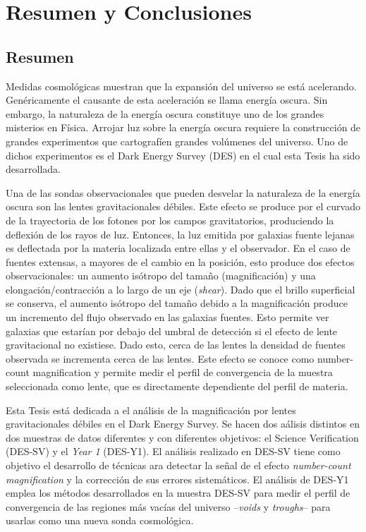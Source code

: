 \chapter*{Resumen y Conclusiones}
\section*{Resumen}
Medidas cosmol\'ogicas muestran que la expansi\'on del universo se est\'a acelerando. Gen\'ericamente el causante de esta aceleraci\'on se llama energ\'ia oscura. Sin embargo, la naturaleza de la energ\'ia oscura constituye uno de los grandes misterios en F\'isica. Arrojar luz sobre la energ\'ia oscura requiere la construcci\'on de grandes experimentos que cartograf\'ien grandes vol\'umenes del universo. Uno de dichos experimentos es el Dark Energy Survey (DES) en el cual esta Tesis ha sido desarrollada.
\newline

Una de las sondas observacionales que pueden desvelar la naturaleza de la energ\'ia oscura son las lentes gravitacionales d\'ebiles. Este efecto se produce por el curvado de la trayectoria de los fotones por los campos gravitatorios, produciendo la deflexi\'on de los rayos de luz. Entonces, la luz emitida por galaxias fuente lejanas es deflectada por la materia localizada entre ellas y el observador. En el caso de fuentes extensas, a mayores de el cambio en la posici\'on, esto produce dos efectos observacionales: un aumento is\'otropo del tama\~no (magnificaci\'on) y una elongaci\'on/contracci\'on a lo largo de un eje ({\it shear}). Dado que el brillo superficial se conserva, el aumento is\'otropo del tama\~no debido a la magnificaci\'on produce un incremento del flujo observado en las galaxias fuentes. Esto permite ver galaxias que estar\'ian por debajo del umbral de detecci\'on si el efecto de lente gravitacional no existiese. Dado esto, cerca de las lentes la densidad de fuentes observada se incrementa cerca de las lentes. Este efecto se conoce como {number-count magnification} y permite medir el perfil de convergencia de la muestra seleccionada como lente, que es directamente dependiente del perfil de materia.
\newline

Esta Tesis est\'a dedicada a el an\'alisis de la magnificaci\'on por lentes gravitacionales d\'ebiles en el Dark Energy Survey. Se hacen dos a\'alisis distintos en dos muestras de datos diferentes y con diferentes objetivos: el {Science Verification} (DES-SV) y el {\it Year 1} (DES-Y1). El an\'alisis realizado en DES-SV tiene como objetivo el desarrollo de t\'ecnicas ara detectar la se\~nal de el efecto {\it number-count magnification} y la correcci\'on de sus errores sistem\'aticos. El an\'alisis de DES-Y1 emplea los m\'etodos desarrollados en la muestra DES-SV para medir el perfil de convergencia de las regiones m\'as vac\'ias del universo --{\it voids} y {\it troughs}-- para usarlas como una nueva sonda cosmol\'ogica.

